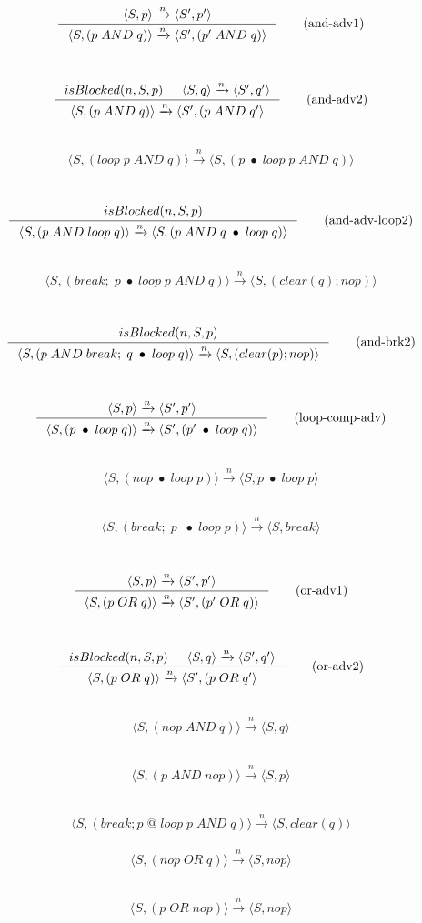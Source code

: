 \documentclass[9pt]{article}
\newcommand{\inner}{\xrightarrow{n}}
\newcommand{\tuple}[1]{\langle#1\rangle}
\begin{document}
~
\[
  \inference{\tuple{ S, p} \inner \tuple{ S', p'}}
            {\tuple{ S, (p \; AND \; q)} \inner \tuple{ S', (p' \; AND \; q)}}
            \tag{and-adv1}
\]

~
\[
  \inference{isBlocked(n,S,p) & \tuple{ S, q} \inner \tuple{ S', q'}} 
            {\tuple{ S, (p \; AND \; q)} \inner \tuple{ S', (p \; AND \; q'}}
            \tag{and-adv2}
\]

~
\[
  \tuple{S, (loop \; p \; AND \; q)} \inner \tuple{S, (p \; \bullet \; loop \; p \; AND  \; q)}
  \tag{and-adv-loop1}
\]

~
\[
  \inference {isBlocked(n,S,p)}
             {\tuple{S, (p \; AND \; loop \; q)} \inner \tuple{S, (p \; AND \; q \; \bullet \; loop \; q)}}
  \tag{and-adv-loop2}
\]

~
\[
  \tuple{S, (break; \; p \; \bullet \; loop \; p \; AND \; q)} \inner \tuple {S, (clear(q) ; nop)} 
  \tag{and-brk1}
\]

~
\[
  \inference{isBlocked(n,S,p)}
            {\tuple{S, (p \; AND \; break; \; q \; \bullet \; loop \; q)} \inner \tuple {S, (clear(p) ; nop)}} 
  \tag{and-brk2}
\]

~
\[
  \inference{\tuple{ S, p} \inner \tuple{ S', p'}}
            {\tuple{ S, (p \; \bullet \; loop\; q)} \inner \tuple{ S', (p' \; \bullet \; loop \; q)}}
            \tag{loop-comp-adv}
\]

~
\[
  \tuple{ S, (nop\; \bullet \; loop \; p)} \inner \tuple{ S, p \; \bullet \; loop \; p}
    \tag{loop-comp-nop}
\]

~
\[
  \tuple{ S, (break ; \; p \; \; \bullet \; loop \; p) } \inner \tuple{ S, break}
    \tag{loop-comp-break}
\]

~
\[
  \inference{\tuple{ S, p} \inner \tuple{ S', p'}}
            {\tuple{ S, (p \; OR \; q)} \inner \tuple{ S', (p' \; OR \; q)}}
            \tag{or-adv1}
\]

~
\[
  \inference{isBlocked(n,S,p) & \tuple{ S, q} \inner \tuple{ S', q'}} 
            {\tuple{ S, (p \; OR \; q)} \inner \tuple{ S', (p \; OR \; q'}}
            \tag{or-adv2}
\]

~
\[
  \tuple{ S, (nop \; AND \; q)} \inner \tuple{S, q}
  \tag{and-nop1}
\]

~
\[
  \tuple{ S, (p \; AND \; nop)} \inner \tuple{S, p}
  \tag{and-nop2}
\]

~
\[
  \tuple{ S, (break ; p \; @ \;loop \; p \; AND \; q)} \inner \tuple{S, clear(q)}
  \tag{and-brk1}
\]
~
\[
  \tuple{ S, (nop \; OR \; q)} \inner \tuple{S, nop}
  \tag{or-nop1}
\]

~
\[
  \tuple{ S, (p \; OR \; nop)} \inner \tuple{S, nop}
  \tag{or-nop2}
\]
\end{document}
